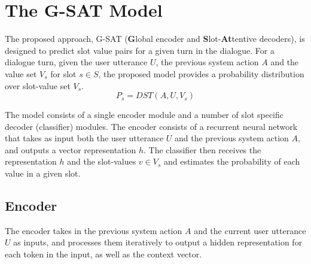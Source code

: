 \documentclass{article}
\begin{document}
\section{The G-SAT Model}
\label{sec:model}
The proposed approach, G-SAT (\textbf{G}lobal encoder and \textbf{S}lot-\textbf{At}tentive decoders), is designed to predict slot value pairs for a given turn in the dialogue.
For a dialogue turn, given the user utterance $U$, the previous system action $A$ and the value set $V_s$ for slot $s \in S$, the proposed model provides a probability distribution over slot-value set $V_s$.
\begin{equation}
    P_s = DST(A, U, V_s)
\end{equation}

The model consists of a single encoder module and a number of slot specific decoder (classifier) modules.
The encoder consists of a recurrent neural network that takes as input both the user utterance $U$ and the previous system action $A$, and outputs a vector representation $h$.
The classifier then receives the representation $h$ and the slot-values $v \in V_s$ and estimates the probability of each value in a given slot.

\subsection{Encoder}
The encoder takes in the previous system action $A$ and the current user utterance $U$ as inputs, and processes them iteratively to output a hidden representation for each token in the input, as well as the context vector.
\end{document}

